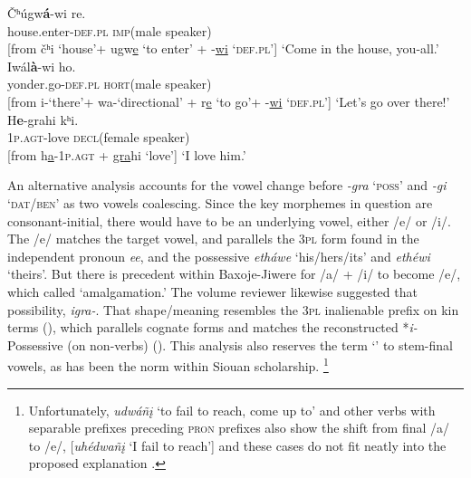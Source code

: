 \documentclass[output=paper]{LSP/langsci}
\begin{document}
\begin{exe}
\ex \gll \v{C}ʰúgw\textbf{á}-wi    re. \\
house.enter-\textsc{def.pl}  \textsc{imp}(male speaker) \\

[from \v{c}ʰi `house'+ ugw\underline{e} `to enter' + -\underline{wi} `\textsc{def.pl}']
\trans `Come in the house, you-all.'  \citep[``Giants'' Bk2 LN49]{Marsh1936}
\ex \gll Iwál\textbf{à}-wi          ho. \\
yonder.go-\textsc{def.pl} \textsc{hort}(male speaker)\\ 

[from i-`there'+ wa-`directional' + r\underline{e} `to go'+ -\underline{wi} `\textsc{def.pl}'] 		
\trans `Let's go over there!' 	\citep[``The Twins'' LN65]{Marsh1936}
\ex \gll  H\textbf{e}-grahi kʰi.  \\
1\textsc{p.agt}-love   \textsc{decl}(female speaker) \\

[from h\underline{a}-1\textsc{p.agt} + \underline{gra}hi `love'] 
\trans `I love him.'  
\end{exe} 

An alternative analysis accounts for the vowel change before \textit{-gra} `\textsc{poss}' and \textit{-gi} `\textsc{dat/ben}' as two vowels coalescing.  Since the key morphemes in question are consonant-initial, there would have to be an underlying vowel, either /e/ or /i/.   The /e/ matches the target vowel, and parallels the \textsc{3pl} form found in the independent pronoun \textit{ee}, and the possessive \textit{etháwe} `his/hers/its' and \textit{ethéwi} `theirs'.  But there is precedent within Baxoje-Jiwere for /a/ + /i/ to become /e/, which \citet[239]{Whitman1947} called `amalgamation.'  The volume reviewer likewise suggested that possibility, \textit{igra-}.  That shape/meaning resembles the \textsc{3pl} inalienable prefix on kin terms (), which parallels cognate  forms and matches the reconstructed  *\textit{i-} Possessive (on non-verbs) (\citealt{Rood1979}).  This analysis also reserves the term `' to stem-final vowels, as has been the norm within Siouan scholarship. \footnote{Unfortunately, \textit{udwáñ\k{i}} `to fail to reach, come up to' and other verbs with separable prefixes preceding \textsc{pron} prefixes also show the shift from final /a/ to /e/, [\textit{uhédwañ\k{i}} `I fail to reach'] and these cases do not fit neatly into the proposed explanation \citep[240]{Whitman1947}.}
           
\end{document}
